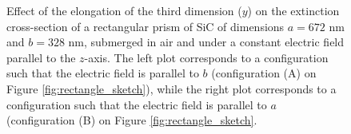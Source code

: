 \begin{figure}[h]
    \centering
    \caption{Effect of the elongation of the third dimension ($y$) on the 
        extinction cross-section of a rectangular prism of SiC of dimensions $a=672$ nm 
        and $b=328$ nm, submerged in air and under a constant electric field 
        parallel to the $z$-axis. The left plot corresponds to a configuration such that the electric 
        field is parallel to $b$ (configuration (A) on Figure \ref{fig:rectangle_sketch}), while the 
        right plot corresponds to a configuration such that the electric field is 
        parallel to $a$ (configuration (B) on Figure \ref{fig:rectangle_sketch}.}
    \label{fig:ext_y_14}   
 \end{figure}

